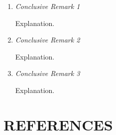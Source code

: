 \documentclass[12pt,a4paper, twoside]{report}
\begin{document}
\begin{enumerate}[itemsep=0.3cm]
\item \textit{Conclusive Remark 1}

\quad Explanation.

\item \textit{Conclusive Remark 2}

\quad Explanation.

\item \textit{Conclusive Remark 3}

\quad Explanation.
\end{enumerate}  

\section{REFERENCES}
\begingroup
\let\clearpage\relax
\renewcommand\bibname{}
\setlength{\parskip}{-1.5cm}
\setlength{\bibsep}{10pt}
\endgroup

\newpage %
\end{document}
